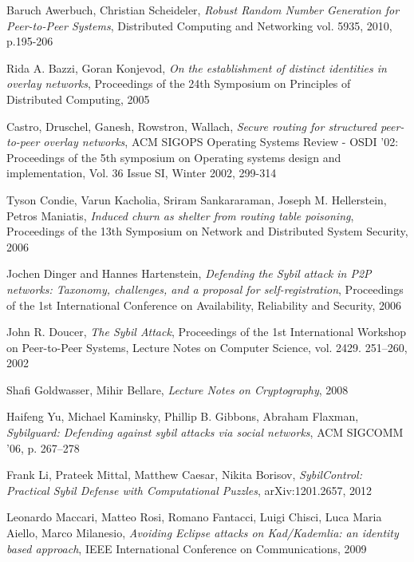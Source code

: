 \begin{thebibliography}{99}

  Baruch Awerbuch, Christian Scheideler,
  \textit{Robust Random Number Generation for Peer-to-Peer Systems},
  Distributed Computing and Networking vol. 5935, 2010, p.195-206

  Rida A. Bazzi, Goran Konjevod,
  \textit{On the establishment of distinct identities in overlay networks},
  Proceedings of the 24th Symposium on Principles of Distributed Computing,
  2005

 Castro, Druschel, Ganesh, Rowstron, Wallach,
  \textit{Secure routing for structured peer-to-peer overlay networks},
  ACM SIGOPS Operating Systems Review - OSDI '02: Proceedings of the 5th
  symposium on Operating systems design and implementation,
  Vol. 36 Issue SI, Winter 2002,
  299-314

  Tyson Condie, Varun Kacholia, Sriram Sankararaman, Joseph M. Hellerstein,
  Petros Maniatis,
  \textit{Induced churn as shelter from routing table poisoning},
  Proceedings of the 13th Symposium on Network and Distributed System Security,
  2006
 
  Jochen Dinger and Hannes Hartenstein,
  \textit{Defending the Sybil attack in P2P networks: Taxonomy, challenges, and
  a proposal for self-registration},
  Proceedings of the 1st International Conference on Availability, Reliability
  and Security,
  2006

 John R. Doucer,
  \textit{The Sybil Attack},
  Proceedings of the 1st International Workshop on Peer-to-Peer Systems,
  Lecture Notes on Computer Science, vol.  2429. 251–260,
  2002

  Shafi Goldwasser, Mihir Bellare,
  \textit{Lecture Notes on Cryptography},
  2008


Haifeng Yu, Michael Kaminsky, Phillip B. Gibbons, Abraham Flaxman,
\textit{Sybilguard: Defending against sybil attacks via social networks},
ACM SIGCOMM ’06, p. 267--278

Frank Li, Prateek Mittal, Matthew Caesar, Nikita Borisov,
\textit{SybilControl: Practical Sybil Defense with Computational Puzzles},
arXiv:1201.2657, 2012

  Leonardo Maccari, Matteo Rosi, Romano Fantacci, Luigi Chisci, Luca Maria
  Aiello, Marco Milanesio,
  \textit{Avoiding Eclipse attacks on Kad/Kademlia: an identity based approach},
   IEEE International Conference on Communications, 2009


\end{thebibliography}

